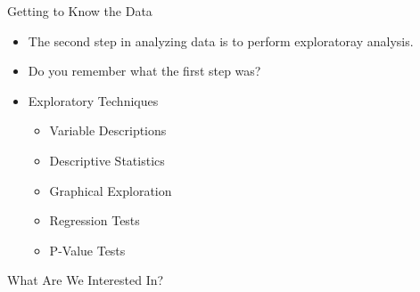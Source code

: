 \documentclass[handout]{beamer}
\begin{document}
\begin{frame}{Getting to Know the Data}
\begin{itemize}[<+->]
   \item The second step in analyzing data is to perform exploratoray analysis.
   \item Do you remember what the first step was?
   \item Exploratory Techniques
   \begin{itemize}
        \item Variable Descriptions
        \item Descriptive Statistics
        \item Graphical Exploration
        \item Regression Tests
        \item P-Value Tests
   \end{itemize}
\end{itemize}
\end{frame}

\begin{frame}{What Are We Interested In?}

\end{frame}
\end{document}
